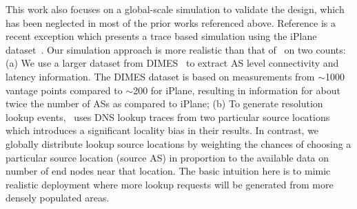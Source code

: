 This work also focuses on a global-scale simulation to validate the design, which has been neglected in most of the prior works referenced above. Reference \cite{jakab} is a recent exception which presents a trace based simulation using the iPlane dataset~\cite{madhyastha}. Our simulation approach is more realistic than that of~\cite{jakab} on two counts: (a) We use a larger dataset from DIMES~\cite{shavitt} to extract AS level connectivity and latency information. The DIMES dataset is based on measurements from $\sim$1000 vantage points compared to $\sim$200 for iPlane, resulting in information for about twice the number of ASs as compared to iPlane; (b) To generate resolution lookup events,~\cite{jakab} uses DNS lookup traces from two particular source locations which introduces a significant locality bias in their results. In contrast, we globally distribute lookup source locations by weighting the chances of choosing a particular source location (source AS) in proportion to the available data on number of end nodes near that location. The basic intuition here is to mimic realistic deployment where more lookup requests will be generated from more densely populated areas.








